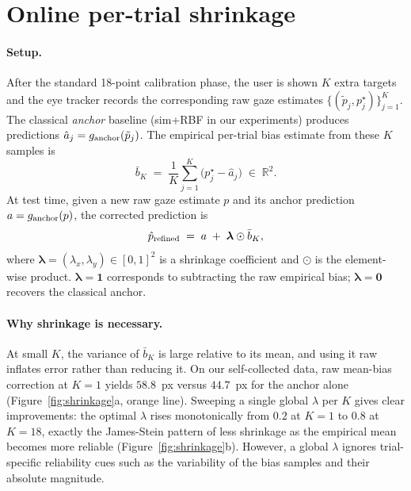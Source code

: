 \section{Online per-trial shrinkage}
\label{sec:method}

\paragraph{Setup.}
After the standard 18-point calibration phase, the user is shown $K$
extra targets and the eye tracker records the corresponding raw gaze
estimates $\{(\tilde p_j, p_j^\star)\}_{j=1}^K$. The classical
\emph{anchor} baseline (sim+RBF in our experiments) produces predictions
$\hat{a}_j = g_{\rm anchor}(\tilde p_j)$. The empirical per-trial bias
estimate from these $K$ samples is
\begin{equation}
\bar{b}_K \;=\; \frac{1}{K} \sum_{j=1}^{K} \big(p_j^\star - \hat{a}_j\big)
\;\in\; \mathbb{R}^2.
\label{eq:emp-bias}
\end{equation}
At test time, given a new raw gaze estimate $p$ and its anchor prediction
$a = g_{\rm anchor}(p)$, the corrected prediction is
\begin{equation}
\hat{p}_{\rm refined} \;=\; a \;+\; \boldsymbol{\lambda} \odot \bar{b}_K,
\label{eq:correction}
\end{equation}
where $\boldsymbol{\lambda} = (\lambda_x, \lambda_y) \in [0, 1]^2$ is a
shrinkage coefficient and $\odot$ is the element-wise product.
$\boldsymbol{\lambda} = \boldsymbol{1}$ corresponds to subtracting the raw
empirical bias; $\boldsymbol{\lambda} = \boldsymbol{0}$ recovers the
classical anchor.

\paragraph{Why shrinkage is necessary.}
At small $K$, the variance of $\bar{b}_K$ is large relative to its mean,
and using it raw inflates error rather than reducing it. On our
self-collected data, raw mean-bias correction at $K = 1$ yields $58.8$~px
versus $44.7$~px for the anchor alone (Figure~\ref{fig:shrinkage}a, orange
line). Sweeping a single global $\lambda$ per $K$ gives clear
improvements: the optimal $\lambda$ rises monotonically from $0.2$ at
$K=1$ to $0.8$ at $K=18$, exactly the James-Stein pattern of less
shrinkage as the empirical mean becomes more reliable
(Figure~\ref{fig:shrinkage}b). However, a global $\lambda$ ignores
trial-specific reliability cues such as the variability of the bias
samples and their absolute magnitude.

